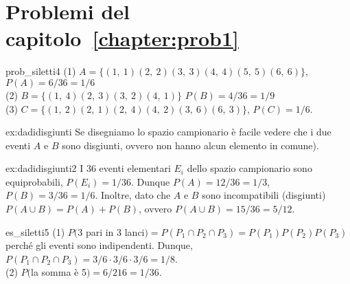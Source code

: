 \section*{Problemi del capitolo~\ref{chapter:prob1}}



\begin{sol}{prob_siletti4}
(1) $A = \{(1,\ 1)(2,\ 2)(3,\ 3)(4,\ 4)(5,\ 5)(6,\ 6)\}$, $P(A) = 6/36 = 1/6$\\ 
(2) $B = \{(1,\ 4) (2,\ 3) (3,\ 2) (4,\ 1)\}$ $P(B) = 4/36 = 1/9$\\ 
(3) $C = \{(1,\ 2)(2,\ 1)(2,\ 4)(4,\ 2)(3,\ 6)(6,\ 3)\}$, $P(C) = 1/6$.
\end{sol}


\begin{sol}{ex:dadidisgiunti}
Se disegniamo lo spazio campionario è facile vedere che i due eventi $A$ e $B$ sono disgiunti, ovvero non  hanno alcun elemento in comune).
\end{sol}


\begin{sol}{ex:dadidisgiunti2}
I 36 eventi elementari $E_i$ dello spazio campionario  sono  equiprobabili, $P(E_i) = 1/36$. Dunque
 $P(A) = 12/36 = 1/3$, $P(B) = 3/36 = 1/6$.
 Inoltre, dato che $A$ e $B$ sono incompatibili (disgiunti)
$P(A \cup B) = P(A) + P(B)$, 
ovvero
$ P(A \cup B) = 15/36 = 5/12$.
\end{sol}


\begin{sol}{es_siletti5}
(1) $P($3 pari in 3 lanci$) = P(P_1 \cap P_2 \cap P_3) = P(P_1) P(P_2) P(P_3)$  perché gli eventi sono indipendenti. Dunque, $P(P_1 \cap P_2 \cap P_3) = 3/6 \cdot 3/6 \cdot 3/6 = 1/8$. \\
(2) $P($la somma è 5$) = 6/216 = 1/36$.
\end{sol}


